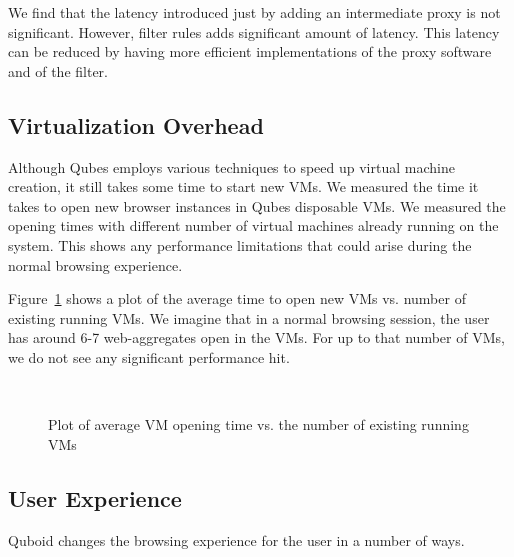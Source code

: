 We find that the latency introduced just by adding an intermediate proxy is not significant. However, filter rules adds significant amount of latency. This latency can be reduced by having more efficient implementations of the proxy software and of the filter.

\subsection{Virtualization Overhead}

Although Qubes employs various techniques to speed up virtual machine creation, it still takes some time to start new VMs. We measured the time it takes to open new browser instances in Qubes disposable VMs. We measured the opening times with different number of virtual machines already running on the system. This shows any performance limitations that could arise during the normal browsing experience.

Figure~\ref{fig:openvm} shows a plot of the average time to open new VMs vs. number of existing running VMs. We imagine that in a normal browsing session, the user has around 6-7 web-aggregates open in the VMs. For up to that number of VMs, we do not see any significant performance hit.

$ $\\

\begin{figure}
\centering
{}
\caption{Plot of average VM opening time vs. the number of existing running VMs} \label{fig:openvm}
\end{figure}

\subsection{User Experience}

Quboid changes the browsing experience for the user in a number of ways.

